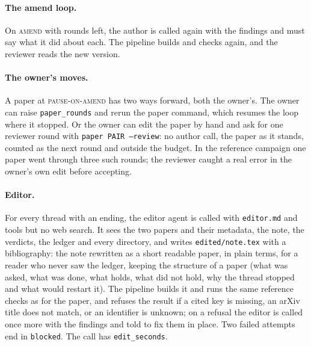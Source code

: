 \documentclass[11pt,a4paper]{article}
\newcommand{\st}[1]{\textsc{#1}}
\newcommand{\file}[1]{\texttt{#1}}
\begin{document}
\paragraph{The amend loop.} On \st{amend} with rounds left, the author is called again with
the findings and must say what it did about each. The pipeline builds and checks again, and the
reviewer reads the new version.

\paragraph{The owner's moves.} A paper at \st{pause-on-amend} has two ways forward, both the
owner's. The owner can raise \file{paper\_rounds} and rerun the paper command, which resumes
the loop where it stopped. Or the owner can edit the paper by hand and ask for one reviewer
round with \file{paper PAIR --review}: no author call, the paper as it stands, counted as the
next round and outside the budget. In the reference campaign one paper went through three such
rounds; the reviewer caught a real error in the owner's own edit before accepting.

\paragraph{Editor.} For every thread with an ending, the editor agent is called with
\file{editor.md} and tools but no web search. It sees the two papers and their metadata, the
note, the verdicts, the ledger and every directory, and writes \file{edited/note.tex} with a
bibliography: the note rewritten as a short readable paper, in plain terms, for a reader who
never saw the ledger, keeping the structure of a paper (what was asked, what was done, what
holds, what did not hold, why the thread stopped and what would restart it). The pipeline
builds it and runs the same reference checks as for the paper, and refuses the result if a
cited key is missing, an arXiv title does not match, or an identifier is unknown; on a refusal
the editor is called once more with the findings and told to fix them in place. Two failed
attempts end in \file{blocked}. The call has \file{edit\_seconds}.
\end{document}
